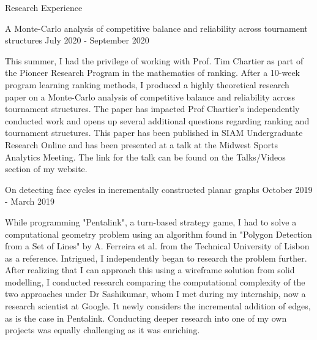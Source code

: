 \documentclass{resume} %
\begin{document}
\begin{rSection}{Research Experience}



\begin{rSubsection}{ A Monte-Carlo analysis of competitive balance and reliability across tournament structures }{ July 2020 - September 2020 }{}
\item  This summer, I had the privilege of working with Prof. Tim Chartier as part of the Pioneer Research Program in the mathematics of ranking. After a 10-week program learning ranking methods, I produced a highly theoretical research paper on a Monte-Carlo analysis of competitive balance and reliability across tournament structures. The paper has impacted Prof Chartier's independently conducted work and opens up several additional questions regarding ranking and tournament structures. This paper has been published in SIAM Undergraduate Research Online and has been presented at a talk at the Midwest Sports Analytics Meeting. The link for the talk can be found on the Talks/Videos section of my website. 

\end{rSubsection}



\begin{rSubsection}{ On detecting face cycles in incrementally constructed planar graphs }{ October 2019 - March 2019 }{}
\item While programming "Pentalink", a turn-based strategy game, I had to solve a computational geometry problem using an algorithm found in "Polygon Detection from a Set of Lines" by A. Ferreira et al. from the Technical University of Lisbon as a reference. Intrigued, I independently began to research the problem further. After realizing that I can approach this using a wireframe solution from solid modelling, I conducted research comparing the computational complexity of the two approaches under Dr Sashikumar, whom I met during my internship, now a research scientist at Google. It newly considers the incremental addition of edges, as is the case in Pentalink. Conducting deeper research into one of my own projects was equally challenging as it was enriching. 

\end{rSubsection}


\end{rSection}
\end{document}

